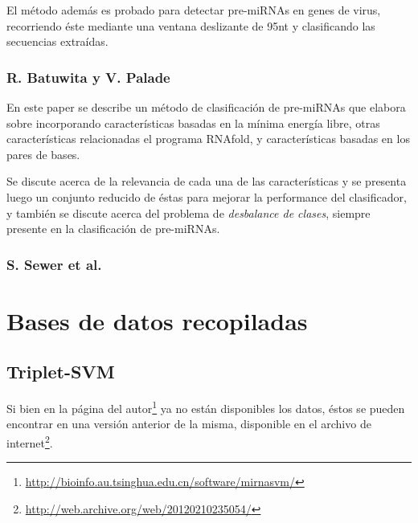\documentclass[12pt,bibliography=oldstyle,DIV=12,parskip=half-]{scrartcl}
\begin{document}
El método además es probado para detectar pre-miRNAs en genes de
virus, recorriendo éste mediante una ventana deslizante de 95nt y
clasificando las secuencias extraídas.
%
\subsubsection{R. Batuwita y V. Palade \cite{batuwita}}
En este paper se describe un método de clasificación de pre-miRNAs que
elabora sobre \cite{ng} incorporando características basadas en la
mínima energía libre, otras características relacionadas el programa
RNAfold, y características basadas en los pares de bases.

Se discute acerca de la relevancia de cada una de las características
y se presenta luego un conjunto reducido de éstas para mejorar la
performance del clasificador, y también se discute acerca del problema
de \emph{desbalance de clases}, siempre presente en la
clasificación de pre-miRNAs.
%
\subsubsection{S. Sewer et al. \cite{sewer}}
%
%
%
%
\section{Bases de datos recopiladas}
%
\subsection{Triplet-SVM \cite{xue}}
%
Si bien en la página del
autor\footnote{\url{http://bioinfo.au.tsinghua.edu.cn/software/mirnasvm/}}
ya no están disponibles los datos, éstos se pueden encontrar en una
versión anterior de la misma, disponible en el archivo de
internet\footnote{\url{http://web.archive.org/web/20120210235054/}}.
\end{document}
